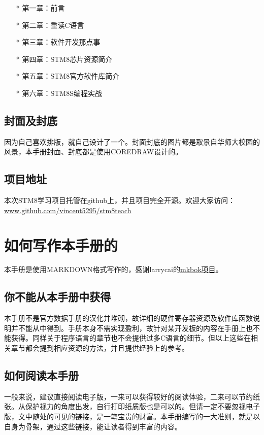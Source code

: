 \documentclass[a4paper]{book}
\begin{document}
\begin{itemize}\setlength{\itemsep}{1pt}\setlength{\parskip}{0pt}\setlength{\parsep}{0pt}
\item[*]
  第一章：前言
\item[*]
  第二章：重读C语言
\item[*]
  第三章：软件开发那点事
\item[*]
  第四章：STM8芯片资源简介
\item[*]
  第五章：STM8官方软件库简介
\item[*]
  第六章：STM8S编程实战
\end{itemize}
\subsection*{封面及封底}

因为自己喜欢排版，就自己设计了一个。封面封底的图片都是取景自华师大校园的风景，本手册封面、封底都是使用COREDRAW设计的。

\subsection*{项目地址}

本次STM8学习项目托管在github上，并且项目完全开源。欢迎大家访问：\href{www.github.com/vincent5295/stm8teach}{www.github.com/vincent5295/stm8teach}

\section*{如何写作本手册的}

本手册是使用MARKDOWN格式写作的，感谢larrycai的\href{www.github.com/larrycai/mkbok}{mkbok项目}。

\subsection*{你不能从本手册中获得}

本手册不是官方数据手册的汉化并堆砌，故详细的硬件寄存器资源及软件库函数说明并不能从中得到。手册本身不需实现盈利，故针对某开发板的内容在手册上也不能获得。同样关于程序语言的章节也不会提供过多C语言的细节。但以上这些在相关章节都会提到相应资源的方法，并且提供经验上的参考。

\subsection*{如何阅读本手册}

一般来说，建议直接阅读电子版，一来可以获得较好的阅读体验，二来可以节约纸张。从保护视力的角度出发，自行打印纸质版也是可以的。但请一定不要忽视电子版，文中随处的可见的链接，是一笔宝贵的财富。本手册编写的一大准则，就是以自身为骨架，通过这些链接，能让读者得到丰富的内容。
\end{document}
